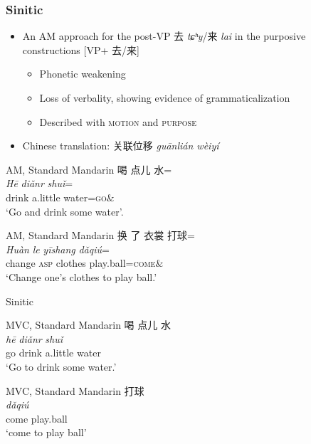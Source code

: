 \documentclass[xcolor=table]{beamer}
\newcommand{\bleu}[1]{{\color{blue}#1}}
\newcommand{\rouge}[1]{{\color{red}#1}}
\newcommand{\ipa}[1]{{\phon\textit{#1}}}
\newcommand{\zh}[1]{{\cn #1}}
\newcommand{\sens}[1]{‘#1’}
\begin{document}
 \begin{frame} 
\frametitle{Sinitic}
\begin{itemize}
\item An AM approach for the post-VP \zh{去 \ipa{tɕʰy}}/\zh{来 \ipa{lai}} in the purposive constructions [VP+ \zh{去/来}] 
\begin{itemize}
\item Phonetic weakening
\item Loss of verbality, showing evidence of grammaticalization
\item Described with \textsc{motion} and \textsc{purpose}
\end{itemize}
\item Chinese translation: \zh{关联位移} \ipa{guānlián wèiyí}
\end{itemize}

\begin{exe}
\ex AM, Standard Mandarin \citetext{\citealp[]{lu1985vpqu}; \citealp[]{lamarre17deictic}} \label{distribution2}
\glll
\zh{喝} \zh{点儿} \zh{水}=\rouge{\zh{去}} \\
\ipa{Hē} \ipa{diǎnr} \ipa{shuǐ}=\rouge{\ipa{qu}} \\
drink  a.little water=\textsc{go}$\&$ \\
\glt \sens{Go and drink some water}.
\end{exe}

\begin{exe}
\ex AM, Standard Mandarin \citep[479]{chao68chinese} 
\glll
\zh{换} \zh{了} \zh{衣裳}  \zh{打球}=\rouge{\zh{来}} \\
\ipa{Huàn} \ipa{le} \ipa{yīshang} \ipa{dǎqi\'{u}}=\rouge{\ipa{lai}}  \\
change \textsc{asp} clothes play.ball=\textsc{come}$\&$ \\
\glt \sens{Change one's clothes to play ball.}
\end{exe}

\end{frame}

\begin{frame}{Sinitic}


\begin{exe}
\ex MVC, Standard Mandarin \citep{lu1985vpqu} \label{inventory2}
\glll
\bleu{\zh{去}} \zh{喝} \zh{点儿} \zh{水} \\
\bleu{\ipa{Qù}} \ipa{hē} \ipa{diǎnr} \ipa{shuǐ} \\
go drink a.little water \\
\glt \sens{Go to drink some water.}
\end{exe}

\begin{exe}
\ex MVC, Standard Mandarin \citep[479]{chao68chinese} 
\glll
 \bleu{\zh{来}} \zh{打球}  \\
\bleu{\ipa{Lái}} \ipa{dǎqi\'{u}}   \\
come play.ball \\
 \glt \sens{come to play ball}
\end{exe}

\end{frame}
\end{document}
